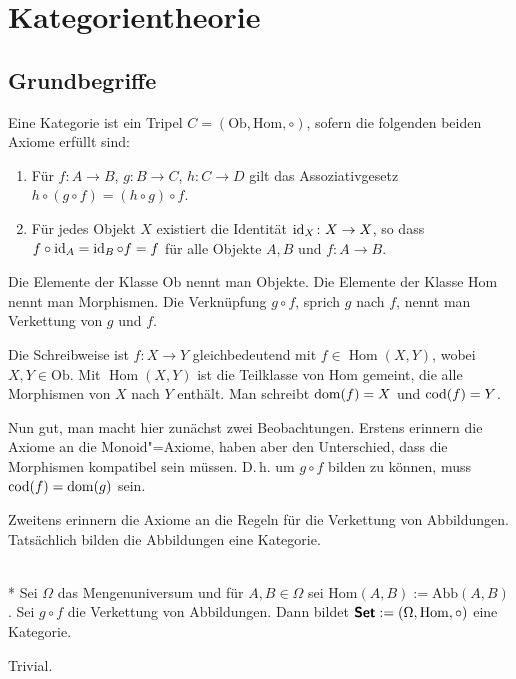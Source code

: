 
\chapter{Kategorientheorie}

\section{Grundbegriffe}

\begin{Definition}[Kategorie]
Eine Kategorie ist ein Tripel $C=(\mathrm{Ob},\mathrm{Hom},{\circ})$,
sofern die folgenden beiden Axiome erfüllt sind:
\begin{enumerate}
\item Für $f\colon A\to B$, $g\colon B\to C$, $h\colon C\to D$ gilt
das Assoziativgesetz $h\circ (g\circ f) = (h\circ g)\circ f$.
\item Für jedes Objekt $X$ existiert die Identität $\operatorname{id}_X\colon X\to X$,
so dass $f\circ\operatorname{id}_A = \operatorname{id}_B\circ f=f$ für alle Objekte $A,B$
und $f\colon A\to B$.
\end{enumerate}
\end{Definition}
Die Elemente der Klasse $\mathrm{Ob}$ nennt man Objekte. Die
Elemente der Klasse $\mathrm{Hom}$ nennt man Morphismen. Die
Verknüpfung $g\circ f$, sprich $g$ nach $f$, nennt man Verkettung
von $g$ und $f$.

Die Schreibweise ist $f\colon X\to Y$ gleichbedeutend mit
$f\in\operatorname{Hom}(X,Y)$, wobei $X,Y\in\mathrm{Ob}$.
Mit $\operatorname{Hom}(X,Y)$ ist die Teilklasse von
$\mathrm{Hom}$ gemeint, die alle Morphismen von $X$ nach $Y$
enthält. Man schreibt $\operatorname{dom}(f) = X$ und $\operatorname{cod}(f) = Y$.

Nun gut, man macht hier zunächst zwei Beobachtungen. Erstens
erinnern die Axiome an die Monoid"=Axiome, haben aber den Unterschied,
dass die Morphismen kompatibel sein müssen. D.\,h. um $g\circ f$
bilden zu können, muss $\operatorname{cod}(f)=\operatorname{dom}(g)$ sein.

Zweitens erinnern die Axiome an die Regeln für die Verkettung
von Abbildungen. Tatsächlich bilden die Abbildungen eine Kategorie.

\begin{Satz}\mbox{}\\*
Sei $\Omega$ das Mengenuniversum und für $A,B\in\Omega$ sei
$\mathrm{Hom}(A,B):=\mathrm{Abb}(A,B)$. Sei $g\circ f$ die Verkettung
von Abbildungen. Dann bildet $\textsf{\textbf{Set}}:=(\Omega,\mathrm{Hom},\circ)$
eine Kategorie.
\end{Satz}
 Trivial.\;\qedsymbol

